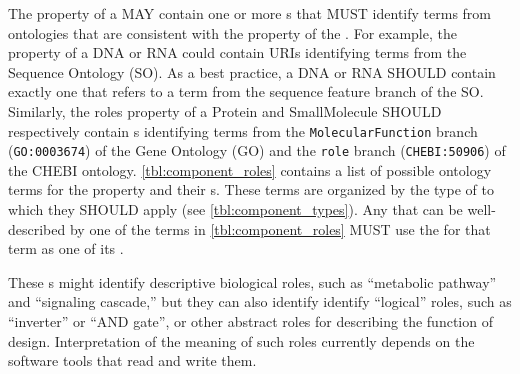 The  property of a  MAY contain one or more s that MUST identify terms from ontologies that are consistent with the  property of the .
For example, the  property of a DNA or RNA  could contain URIs identifying terms from the Sequence Ontology (SO). As a best practice, a DNA or RNA  SHOULD contain exactly one  that refers to a term from the sequence feature branch of the SO.
Similarly, the roles property of a Protein and SmallMolecule  SHOULD respectively contain s identifying terms from the \texttt{MolecularFunction} branch (\texttt{GO:0003674}) of the Gene Ontology (GO) and the \texttt{role} branch (\texttt{CHEBI:50906}) of the CHEBI ontology.
\ref{tbl:component_roles} contains a list of possible ontology terms for the  property and their s. These terms are organized by the type of  to which they SHOULD apply (see \ref{tbl:component_types}). Any  that can be well-described by one of the terms in \ref{tbl:component_roles} MUST use the  for that term as one of its .

These s might identify descriptive biological roles, such as ``metabolic pathway'' and ``signaling cascade,'' but they can also identify identify ``logical'' roles, such as ``inverter'' or ``AND gate'', or other abstract roles for describing the function of design. Interpretation of the meaning of such roles currently depends on the software tools that read and write them.


